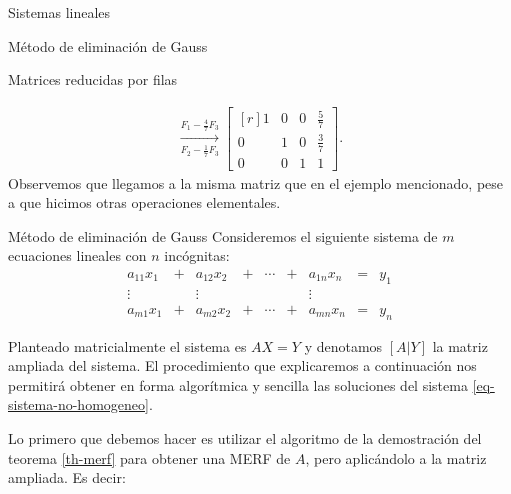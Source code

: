 \begin{chapter}{Sistemas lineales}
\begin{section}{Método de eliminación de Gauss }
\begin{subsection}{Matrices reducidas por filas}
\begin{ejemplo*}
\begin{multline*}
                    \underset{F_2-\frac17F_3}{\stackrel{F_1 -\frac47 F_3}{\longrightarrow}} 
                    \begin{bmatrix*}[r] 1& 0&0& \frac{5}7 \\ 0&1 &0&\frac37 \\ 0&0&1&1 \end{bmatrix*}.
                    \end{multline*}
                    Observemos que llegamos a la misma matriz que en el ejemplo mencionado, pese a que hicimos otras operaciones elementales.
                \end{ejemplo*}
                
            \end{subsection}
                
                

                \begin{subsection}{Método de eliminación de Gauss}\label{elim-gauss} Consideremos el siguiente sistema de $m$ ecuaciones lineales con $n$ incógnitas:
                    \begin{equation}\label{eq-sistema-no-homogeneo}
                    \begin{matrix}
                    a_{11}x_1& + &a_{12}x_2& + &\cdots& + &a_{1n}x_n &= &y_1\\
                    \vdots&  &\vdots& &&  &\vdots \\
                    a_{m1}x_1& + &a_{m2}x_2& + &\cdots& + &a_{mn}x_n &=&y_n
                    \end{matrix}
                    \end{equation}
                    
                    Planteado  matricialmente el sistema es $AX=Y$  y denotamos $[A|Y]$ la matriz ampliada del sistema. El  procedimiento que explicaremos a continuación nos permitirá obtener en forma algorítmica y sencilla las soluciones del sistema \eqref{eq-sistema-no-homogeneo}. 
                    
                    Lo primero que debemos hacer es utilizar el algoritmo de la demostración del teorema \ref{th-merf}  para obtener una MERF de $A$, pero aplicándolo a la matriz ampliada. Es decir:  


\end{subsection}
\end{section}
\end{chapter}
